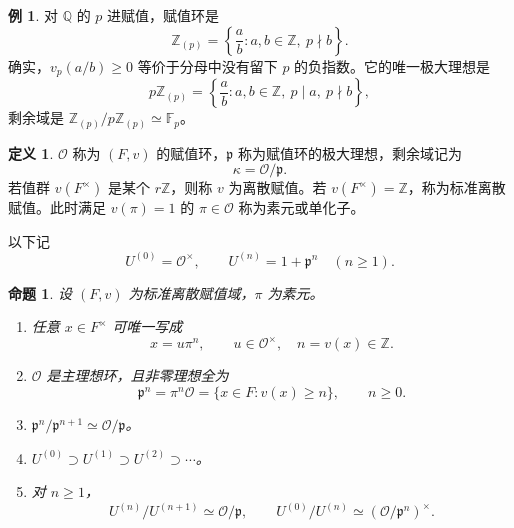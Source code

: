 \documentclass[11pt,a4paper,openany]{ctexbook}
\numberwithin{equation}{chapter}
\newcommand{\Q}{\mathbb{Q}}
\newcommand{\Z}{\mathbb{Z}}
\newcommand{\F}{\mathbb{F}}
\theoremstyle{plain}
\newtheorem{proposition}[theorem]{命题}
\theoremstyle{definition}
\newtheorem{definition}[theorem]{定义}
\newtheorem{example}[theorem]{例}
\theoremstyle{remark}
\begin{document}
\begin{example}
对 $\Q$ 的 $p$ 进赋值，赋值环是
\[
\Z_{(p)}=\left\{\frac ab:a,b\in\Z,\ p\nmid b\right\}.
\]
确实，$v_p(a/b)\ge0$ 等价于分母中没有留下 $p$ 的负指数。它的唯一极大理想是
\[
p\Z_{(p)}=\left\{\frac ab:a,b\in\Z,\ p\mid a,\ p\nmid b\right\},
\]
剩余域是 $\Z_{(p)}/p\Z_{(p)}\simeq\F_p$。
\end{example}

\begin{definition}
$\mathcal O$ 称为 $(F,v)$ 的赋值环，$\mathfrak p$ 称为赋值环的极大理想，剩余域记为
\[
\kappa=\mathcal O/\mathfrak p.
\]
若值群 $v(F^\times)$ 是某个 $r\Z$，则称 $v$ 为离散赋值。若 $v(F^\times)=\Z$，称为标准离散赋值。此时满足 $v(\pi)=1$ 的 $\pi\in\mathcal O$ 称为素元或单化子。
\end{definition}

以下记
\[
U^{(0)}=\mathcal O^\times,\qquad U^{(n)}=1+\mathfrak p^n\quad(n\ge1).
\]

\begin{proposition}
设 $(F,v)$ 为标准离散赋值域，$\pi$ 为素元。
\begin{enumerate}[label=(\arabic*)]
\item 任意 $x\in F^\times$ 可唯一写成
\[
x=u\pi^n,\qquad u\in\mathcal O^\times,\quad n=v(x)\in\Z.
\]
\item $\mathcal O$ 是主理想环，且非零理想全为
\[
\mathfrak p^n=\pi^n\mathcal O=\{x\in F:v(x)\ge n\},\qquad n\ge0.
\]
\item $\mathfrak p^n/\mathfrak p^{n+1}\simeq\mathcal O/\mathfrak p$。
\item $U^{(0)}\supset U^{(1)}\supset U^{(2)}\supset\cdots$。
\item 对 $n\ge1$，
\[
U^{(n)}/U^{(n+1)}\simeq\mathcal O/\mathfrak p,\qquad
U^{(0)}/U^{(n)}\simeq(\mathcal O/\mathfrak p^n)^\times.
\]
\end{enumerate}
\end{proposition}
\end{document}
